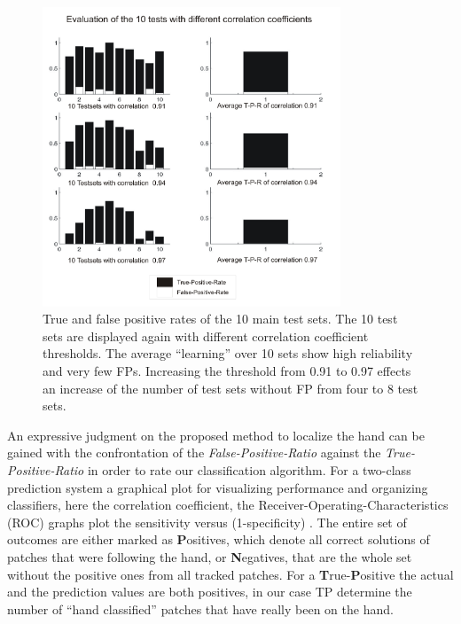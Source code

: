 \documentclass[conference]{IEEEtran}
\begin{document}
%
\begin{figure}
	\begin{center}
		\includegraphics[width=3.5in]{imgs/results/diag.pdf}
			\caption[True and false positive rates of the 10 main test sets. ]{True and false positive rates of the 10 main test sets. The 10 test sets are displayed again with different correlation coefficient thresholds. The average ``learning'' over 10 sets show high reliability and very few FPs. Increasing the threshold from 0.91 to 0.97 effects an increase of the number of test sets without FP from four to 8 test sets.}
			\label{fig:result:diag}
	\end{center}
\end{figure}
%
%
An expressive judgment on the proposed method to localize the hand can be gained with the confrontation of the \textit{False-Positive-Ratio} against the \textit{True-Positive-Ratio} in order to rate our classification algorithm. For a two-class prediction system a graphical plot for visualizing performance and organizing classifiers, here the correlation coefficient, the Receiver-Operating-Characteristics (ROC) graphs plot the sensitivity versus (1-specificity) \cite{ROC04-03}. The entire set of outcomes are either marked as \textbf{P}ositives, which denote all correct solutions of patches that were following the hand, or \textbf{N}egatives, that are the whole set without the positive ones from all tracked patches. %
For a \textbf{T}rue-\textbf{P}ositive the actual and the prediction values are both positives, in our case TP determine the number of ``hand classified'' patches that have really been on the hand. %
\end{document}
